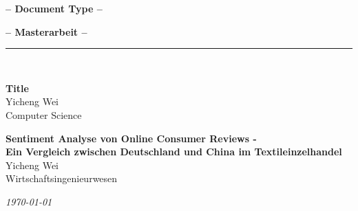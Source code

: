 %
\vspace{2.0cm}
%
\begin{center}
\begin{en}
    \Large{\textbf{--  Document Type --}}
\end{en}
\begin{de}
    \Large{\textbf{--  Masterarbeit --}}
\end{de}
    \rule{\textwidth}{0.6pt}\\[0.5cm]
\begin{en}
    \Large{\textbf{Title}}\\[3.0cm]
    \Large{Yicheng Wei}\\
    \Large{Computer Science}\\
\end{en}
\begin{de}
    \large{\textbf{Sentiment Analyse von Online Consumer Reviews - \\
                    Ein Vergleich zwischen Deutschland und China im Textileinzelhandel}}\\[3.0cm]
    \large{Yicheng Wei}\\
    \large{Wirtschaftsingenieurwesen}\\
\end{de}
\end{center}
%
\begin{center}
	 \large{\textit{\today}}
\end{center}
%
\vfill
\begin{center}
	\large
\begin{en}
        \\[0.2em]
        \\[0.2em]
\end{en}
\begin{de}
        \\[0.2em]
\end{de}
	\normalsize
\end{center}
%
